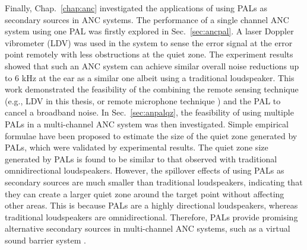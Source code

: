 {
    Finally, Chap.~\ref{chap:anc} investigated the applications of using PALs as secondary sources in ANC systems.
    The performance of a single channel  ANC system using one PAL was firstly explored in Sec.~\ref{sec:ancpal}.
    A laser Doppler vibrometer (LDV) was used in the system to sense the error signal at the error point remotely with less obstructions at the quiet zone. 
    The experiment results showed that such an ANC system can achieve similar overall noise reductions up to 6 kHz at the ear as a similar one albeit using a traditional loudspeaker.
    This work demonstrated the feasibility of the combining the remote sensing technique (e.g., LDV in this thesis, or remote microphone technique \cite{Das2011PerformanceEvaluationActive, Jung2018EstimationPressureListener}) and the PAL to cancel a broadband noise.
    In Sec.~\ref{sec:anpalqz}, the feasibility of using multiple PALs in a multi-channel ANC system was then investigated.
    Simple empirical formulae have been proposed to estimate the size of the quiet zone generated by PALs, which were validated by experimental results. 
    The quiet zone size generated by PALs is found to be similar to that observed with
    traditional omnidirectional loudspeakers. However, the spillover effects of using PALs as  secondary sources are much smaller than traditional loudspeakers, indicating that they can create  a larger quiet zone around the target point without affecting other areas.
    This is because PALs  are a highly directional loudspeakers, whereas traditional loudspeakers are omnidirectional. 
    Therefore, PALs provide promising alternative secondary sources in multi-channel ANC systems, such as a virtual sound barrier system \cite{Qiu2019IntroductionVirtualSound}.
}

